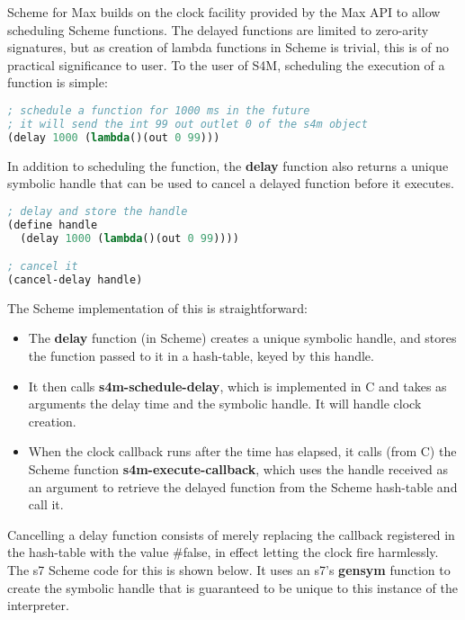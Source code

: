 \documentclass[acmsmall]{acmart}
\begin{document}
Scheme for Max builds on the clock facility provided by the Max API to allow scheduling
Scheme functions. The delayed functions are limited to zero-arity signatures, but as
creation of lambda functions in Scheme is trivial, this is of no practical significance to 
user. To the user of S4M, scheduling the execution of a function is simple:

\begin{lstlisting}[language=lisp]
; schedule a function for 1000 ms in the future
; it will send the int 99 out outlet 0 of the s4m object
(delay 1000 (lambda()(out 0 99)))
\end{lstlisting}

In addition to scheduling the function, the \textbf{delay} function also returns a unique
symbolic handle that can be used to cancel a delayed function before it executes.

\begin{lstlisting}[language=lisp]
; delay and store the handle
(define handle 
  (delay 1000 (lambda()(out 0 99))))

; cancel it
(cancel-delay handle)
\end{lstlisting}

The Scheme implementation of this is straightforward:

\begin{itemize}
\item The \textbf{delay} function (in Scheme) creates a unique symbolic handle, and stores the 
  function passed to it in a hash-table, keyed by this handle.
\item It then calls \textbf{s4m-schedule-delay}, which is implemented
  in C and takes as arguments the delay time and the symbolic handle. It will handle 
  clock creation.
\item When the clock callback runs after the time has elapsed, it calls (from C) the Scheme function 
  \textbf{s4m-execute-callback}, which uses the handle received as an argument 
  to retrieve the delayed function from the Scheme hash-table and call it.
\end{itemize}

Cancelling a delay function consists of merely replacing the callback registered
in the hash-table with the value \#false, in effect letting the clock fire harmlessly.
The s7 Scheme code for this is shown below. It uses an s7's \textbf{gensym} function to create the
symbolic handle that is guaranteed to be unique to this instance of the interpreter.
\end{document}
